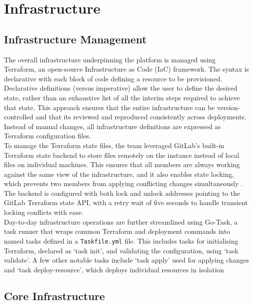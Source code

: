 
\section{Infrastructure}

\subsection{Infrastructure Management}
The overall infrastructure underpinning the platform is managed using Terraform, an open-source Infrastructure as Code (IaC) framework. The syntax is declarative with each block of code defining a resource to be provisioned. Declarative definitions (versus imperative) allow the user to define the desired state, rather than an exhaustive list of all the interim steps required to achieve that state. This approach ensures that the entire infrastructure can be version-controlled and that its reviewed and reproduced consistently across deployments. Instead of manual changes, all infrastructure definitions are expressed as Terraform configuration files.
\\

To manage the Terraform state files, the team leveraged GitLab’s built-in Terraform state backend to store files remotely on the instance instead of local files on individual machines. This ensures that all members are always working against the same view of the infrastructure, and it also enables state locking, which prevents two members from applying conflicting changes simultaneously \cite{valtanen2023improving}. The backend is configured with both lock and unlock addresses pointing to the GitLab Terraform state API, with a retry wait of five seconds to handle transient locking conflicts with ease.
\\ 

Day-to-day infrastructure operations are further streamlined using Go-Task, a task runner that wraps common Terraform and deployment commands into named tasks defined in a \texttt{Taskfile.yml} file. This includes tasks for initialising Terraform, declared as ‘task init’, and validating the configuration, using ‘task validate’. A few other notable tasks include ‘task apply’ used for applying changes and ‘task deploy-resource’, which deploys individual resources in isolation

\subsection{Core Infrastructure}


